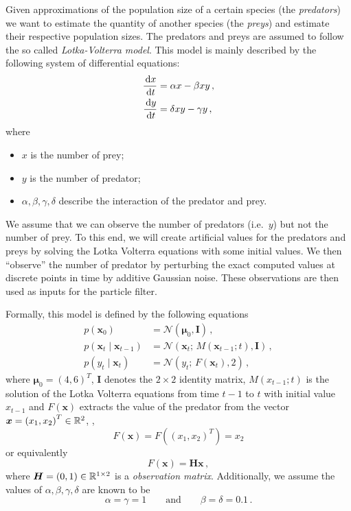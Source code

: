 \begin{example}\label{ex:lv1}
  Given approximations of the population size of a certain species
  (the \emph{predators}) we want to estimate the quantity of another
  species (the \emph{preys}) and estimate their respective population
  sizes. The predators and preys are assumed to follow the so called
  \emph{Lotka-Volterra model}. This model is mainly described by the
  following system of differential equations:
  \begin{equation}
    \label{eq:lotka}
    \begin{aligned}
      \frac{\,\mathrm{d}x}{\,\mathrm{d}t} &= \alpha x - \beta xy \,, \\
      \frac{\,\mathrm{d}y}{\,\mathrm{d}t} &= \delta xy - \gamma y \,,
    \end{aligned}
  \end{equation}
  where
  \begin{itemize}
  \item $x$ is the number of prey;
  \item $y$ is the number of predator;
  \item $\alpha, \beta, \gamma, \delta$ describe the interaction of
    the predator and prey.
  \end{itemize}
  We assume that we can observe the number of predators (i.e.\ $y$)
  but not the number of prey. To this end, we will create artificial
  values for the predators and preys by solving the Lotka Volterra
  equations with some initial values. We then ``observe'' the number
  of predator by perturbing the exact computed values at discrete
  points in time by additive Gaussian noise. These observations are
  then used as inputs for the particle filter.

  Formally, this model is defined by the following equations
  \begin{equation}
    \label{eq:lv}
    \begin{aligned}
      p(\bm{x}_0) &= \mathcal{N}(\bm{\mu}_0, \bm{I})\,, \\
      p(\bm{x}_t \mid \bm{x}_{t-1}) &= \mathcal{N}(\bm{x}_t;\, M(\bm{x}_{t-1}; t), \bm{I})\,, \\
      p(y_t \mid \bm{x}_t) &= \mathcal{N}(y_t;\, F(\bm{x}_{t}), 2) \,,
    \end{aligned}
  \end{equation}
  where $\bm{\mu}_0 = {(4, 6)}^T$, $\bm{I}$ denotes the $2 \times 2$
  identity matrix, $M(x_{t-1}; t)$ is the solution of the Lotka
  Volterra equations from time $t-1$ to $t$ with initial value
  $x_{t-1}$ and $F(\bm{x})$ extracts the value of the predator from
  the vector $\bm{x} = {(x_1, x_2)}^T \in \mathbb{R}^2$, \ie,
  \begin{equation}
    \label{eq:lv1:obs}
    F(\bm{x}) = F({(x_1, x_2)}^T) = x_2
  \end{equation}
  or equivalently
  \[
    F(\bm{x}) = \bm{H} \bm{x}\,,
  \]
  where $\bm{H} = (0, 1) \in \mathbb{R}^{1 \times 2}$ is a \emph{observation
    matrix}. Additionally, we assume the values of
  $\alpha, \beta, \gamma, \delta$ are known to be
  \[
    \alpha = \gamma = 1 \qquad \text{and} \qquad \beta = \delta =
    0.1\,.
  \]


\end{example}
